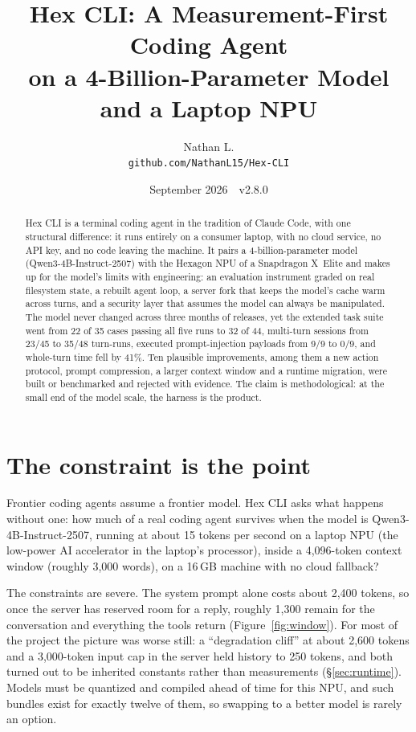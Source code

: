 \documentclass[11pt]{article}
\title{\textbf{Hex CLI: A Measurement-First Coding Agent\\ on a 4-Billion-Parameter Model and a Laptop NPU}}
\author{Nathan L.\\ \small\texttt{github.com/NathanL15/Hex-CLI}}
\date{September 2026 \,\textperiodcentered\, v2.8.0}
\begin{document}
\maketitle

\begin{abstract}
\noindent
Hex CLI is a terminal coding agent in the tradition of Claude Code, with one
structural difference: it runs entirely on a consumer laptop, with no cloud
service, no API key, and no code leaving the machine. It pairs a
4-billion-parameter model (Qwen3-4B-Instruct-2507) with the Hexagon NPU of
a Snapdragon X~Elite and makes up for the model's limits with engineering:
an evaluation instrument graded on real filesystem state, a rebuilt agent
loop, a server fork that keeps the model's cache warm across turns, and a
security layer that assumes the model can always be manipulated. The model
never changed across three months of releases, yet the extended task suite
went from 22 of 35 cases passing all five runs to 32 of 44, multi-turn
sessions from 23/45 to 35/48 turn-runs, executed prompt-injection payloads
from 9/9 to 0/9, and whole-turn time fell by 41\%. Ten plausible
improvements, among them a new action protocol, prompt compression, a larger
context window and a runtime migration, were built or benchmarked and
rejected with evidence. The claim is methodological: at the small end of the
model scale, the harness is the product.
\end{abstract}

\section{The constraint is the point}

Frontier coding agents assume a frontier model. Hex CLI asks what happens
without one: how much of a real coding agent survives when the model is
Qwen3-4B-Instruct-2507, running at about 15 tokens per second on a laptop
NPU (the low-power AI accelerator in the laptop's processor), inside a
4{,}096-token context window (roughly 3{,}000 words), on a 16\,GB machine
with no cloud fallback?

The constraints are severe. The system prompt alone costs about 2{,}400
tokens, so once the server has reserved room for a reply, roughly 1{,}300
remain for the conversation and everything the tools return
(Figure~\ref{fig:window}). For most of the project the picture was worse
still: a ``degradation cliff'' at about 2{,}600 tokens and a 3{,}000-token
input cap in the server held history to 250 tokens, and both turned out to
be inherited constants rather than measurements (\S\ref{sec:runtime}).
Models must be quantized and compiled ahead of time for this NPU, and such
bundles exist for exactly twelve of them, so swapping to a better model is
rarely an option.
\end{document}
